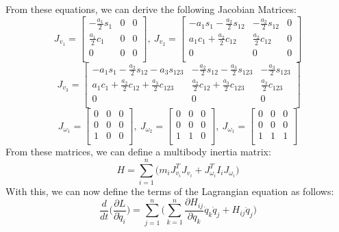 \documentclass[a4paper]{article}
\begin{document}
\noindent From these equations, we can derive the following Jacobian Matrices:
$$J_{v_1} = \begin{bmatrix}
			  -\frac{a_1}{2}s_1 & 0 & 0\\
              \frac{a_1}{2}c_1 & 0 & 0\\
              0 & 0 & 0\\
			  \end{bmatrix}, \ 
              J_{v_2}  = \begin{bmatrix}
			  -a_1s_1 -\frac{a_2}{2}s_{12} & - \frac{a_2}{2} s_{12} & 0\\
              a_1 c_1 + \frac{a_2}{2}c_{12} & \frac{a_2}{2}c_{12} & 0 \\
              0 & 0 & 0\\
			  \end{bmatrix}$$ 
$$ \ J_{v_3}  = \begin{bmatrix}
			  -a_1s_1 -\frac{a_2}{2}s_{12} -a_3s_{123} & - \frac{a_2}{2} s_{12} -\frac{a_3}{2}s_{123} & -\frac{a_3}{2}s_{123}\\
              a_1 c_1 + \frac{a_2}{2}c_{12} + \frac{a_3}{2}c_{123} & \frac{a_2}{2}c_{12} + \frac{a_3}{2}c_{123}  & \frac{a_3}{2}c_{123} \\
              0 & 0 & 0\\
			  \end{bmatrix} $$
$$ J_{\omega_1} = \begin{bmatrix}
			  0 & 0 & 0\\
              0 & 0 & 0\\
              1 & 0 & 0\\
			  \end{bmatrix}, \ J_{\omega_2} = \begin{bmatrix}
			  0 & 0 & 0\\
              0 & 0 & 0\\
              1 & 1 & 0\\
			  \end{bmatrix}, \
              J_{\omega_1} = \begin{bmatrix}
			  0 & 0 & 0\\
              0 & 0 & 0\\
              1 & 1 & 1\\
			  \end{bmatrix}$$
From these matrices, we can define a multibody inertia matrix:
$$ H = \sum_{i=1}^n \Big(m_i J_{v_i}^T J_{v_i} + J_{\omega_i}^T I_i J_{\omega_i} \Big) $$
With this, we can now define the terms of the Lagrangian equation as follows:
$$\frac{d}{dt} \Big( \frac{\partial L}{\partial \dot{q}_i} \Big) = \sum_{j=1}^{n} \Big( \sum_{k=1}^{n} \frac{\partial H_{ij}}{\partial q_k} \dot{q}_k \dot{q}_j + H_{ij} \ddot{q}_j \Big)$$
\end{document}

